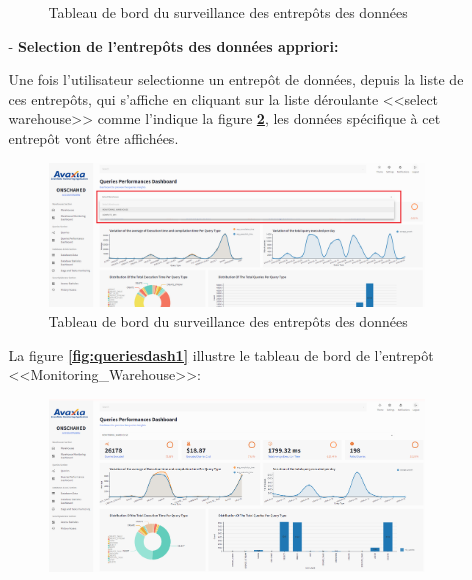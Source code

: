 \begin{itemize}
\begin{enumerate}
\begin{figure}[H]
                        \caption{Tableau de bord du surveillance des entrepôts des données}
                            \label{fig:queriesglob}
                    \end{figure}
                    \item[-] \textbf{Selection  de l'entrepôts des données appriori:}
                    
                    \par Une fois l'utilisateur selectionne un entrepôt de données, depuis la liste de ces entrepôts, qui s'affiche en cliquant sur la liste déroulante <<select warehouse>> comme l'indique la figure \textbf{\ref{fig:select}}, les données spécifique à cet entrepôt vont être affichées.
                    \begin{figure}[H]
                        \centering
                        \includegraphics[width =1\linewidth]{img/captures/queries/queries_selection_warehouse.png}
                        \caption{Tableau de bord du surveillance des entrepôts des données}
                            \label{fig:select}
                    \end{figure}
                    \par La figure \textbf{\ref{fig:queriesdash1}} illustre le tableau de bord de l'entrepôt <<Monitoring\_Warehouse>>:
                    \begin{figure}[H]
                        \centering
                        \includegraphics[width =1\linewidth]{img/captures/queries/monitoring_dash.png}

\end{figure}
\end{enumerate}
\end{itemize}
